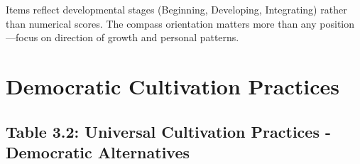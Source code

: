 \documentclass[
  a4paper,
]{report}
\begin{document}
\begin{tcolorbox}[enhanced jigsaw, toprule=.15mm, rightrule=.15mm, breakable, opacitybacktitle=0.6, colframe=quarto-callout-note-color-frame, colback=white, titlerule=0mm, arc=.35mm, leftrule=.75mm, opacityback=0, colbacktitle=quarto-callout-note-color!10!white, bottomrule=.15mm, coltitle=black, toptitle=1mm, bottomtitle=1mm, title=\textcolor{quarto-callout-note-color}{\faInfo}\hspace{0.5em}{Navigation Note}, left=2mm]

Items reflect developmental stages (Beginning, Developing, Integrating)
rather than numerical scores. The compass orientation matters more than
any position---focus on direction of growth and personal patterns.

\end{tcolorbox}

\section{Democratic Cultivation
Practices}\label{democratic-cultivation-practices}

\subsection{Table 3.2: Universal Cultivation Practices - Democratic
Alternatives}\label{table-3.2-universal-cultivation-practices---democratic-alternatives}
\end{document}
